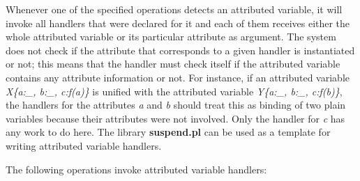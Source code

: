 Whenever one of the specified operations detects an attributed variable,
it will invoke all handlers that were declared for it
and each of them receives either the whole attributed variable
or its particular attribute as argument.
The system does not check if the attribute that corresponds
to a given handler is instantiated or not; this means
that the handler must check itself if the attributed variable
contains any attribute information or not.
For instance, if an attributed variable {\it X\{a:_, b:_, c:f(a)\}}
is unified with the attributed variable {\it Y\{a:_, b:_, c:f(b)\}},
the handlers for the attributes {\it a} and {\it b} should
treat this as binding of two plain variables
because their attributes were not involved.
Only the handler for {\it c} has any work to do here.
The library {\bf suspend.pl} can be used as a template
for writing attributed variable handlers.

The following operations invoke attributed variable handlers:

